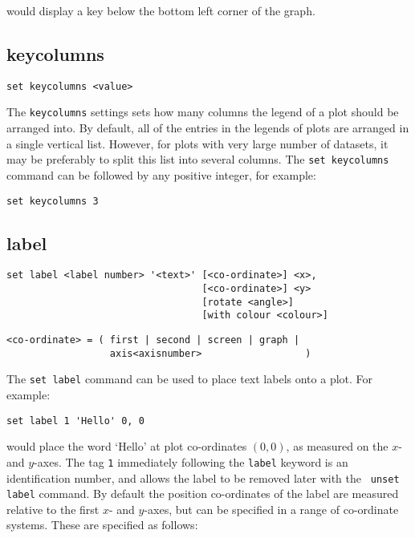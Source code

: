 \noindent would display a key below the bottom left corner of the graph.


\subsection{keycolumns}

\begin{verbatim}
set keycolumns <value>
\end{verbatim}

The {\tt keycolumns} settings sets how many columns the legend of a plot should
be arranged into. By default, all of the entries in the legends of plots are
arranged in a single vertical list. However, for plots with very large number
of datasets, it may be preferably to split this list into several columns. The
{\tt set keycolumns} command can be followed by any positive integer, for
example:

\begin{verbatim}
set keycolumns 3
\end{verbatim}


\subsection{label}

\begin{verbatim}
set label <label number> '<text>' [<co-ordinate>] <x>,
                                  [<co-ordinate>] <y>
                                  [rotate <angle>]
                                  [with colour <colour>]
\end{verbatim}

\begin{verbatim}
<co-ordinate> = ( first | second | screen | graph |
                  axis<axisnumber>                  )
\end{verbatim}

The {\tt set label} command can be used to place text labels onto a plot.  For
example:

\begin{verbatim}
set label 1 'Hello' 0, 0
\end{verbatim}

\noindent would place the word `Hello' at plot co-ordinates $(0,0)$, as measured on the $x$-
and $y$-axes.  The tag {\tt 1} immediately following the {\tt label} keyword is an
identification number, and allows the label to be removed later with the {\tt
unset label} command.  By default the position co-ordinates of the label are
measured relative to the first $x$- and $y$-axes, but can be specified in a
range of co-ordinate systems. These are specified as follows:


